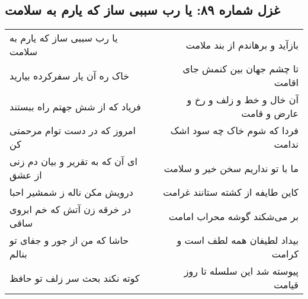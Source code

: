 \begin{center}
\section*{غزل شماره ۸۹: یا رب سببی ساز که یارم به سلامت}
\label{sec:sh089}
\begin{longtable}{l p{0.5cm} r}
یا رب سببی ساز که یارم به سلامت
&&
بازآید و برهاندم از بند ملامت
\\
خاک ره آن یار سفرکرده بیارید
&&
تا چشم جهان بین کنمش جای اقامت
\\
فریاد که از شش جهتم راه ببستند
&&
آن خال و خط و زلف و رخ و عارض و قامت
\\
امروز که در دست توام مرحمتی کن
&&
فردا که شوم خاک چه سود اشک ندامت
\\
ای آن که به تقریر و بیان دم زنی از عشق
&&
ما با تو نداریم سخن خیر و سلامت
\\
درویش مکن ناله ز شمشیر احبا
&&
کاین طایفه از کشته ستانند غرامت
\\
در خرقه زن آتش که خم ابروی ساقی
&&
بر می‌شکند گوشه محراب امامت
\\
حاشا که من از جور و جفای تو بنالم
&&
بیداد لطیفان همه لطف است و کرامت
\\
کوته نکند بحث سر زلف تو حافظ
&&
پیوسته شد این سلسله تا روز قیامت
\\
\end{longtable}
\end{center}
